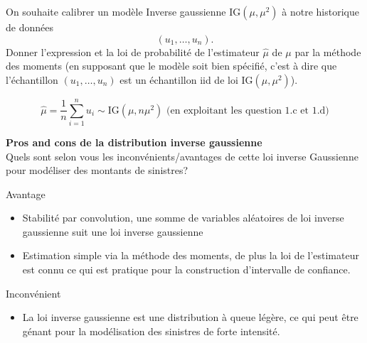 \documentclass[11pt,addpoints, answers]{exam}
\begin{document}
\begin{questions}
On souhaite calibrer un modèle Inverse gaussienne $\text{IG}(\mu,\mu^2)$ à notre historique de données
$$(u_1,\ldots, u_n).$$ 
 Donner l'expression et la loi de probabilité de l'estimateur $\widehat{\mu}$ de $\mu$ par la méthode des moments (en supposant que le modèle soit bien spécifié, c'est à dire que l'échantillon $(u_1,\ldots, u_n)$ est un échantillon iid de loi $\text{IG}(\mu,\mu^2)$).
\begin{solution}
$$
\widehat{\mu} = \frac{1}{n}\sum_{i = 1}^{n}u_i\sim \text{IG}(\mu,n\mu^2)\text{ (en exploitant les question 1.c et 1.d)}
$$
\end{solution}
\question[2] \textbf{Pros and cons de la distribution inverse gaussienne}\\
Quels sont selon vous les inconvénients/avantages de cette loi inverse Gaussienne pour modéliser des montants de sinistres?
\begin{solution}
Avantage
\begin{itemize}
	\item Stabilité par convolution, une somme de variables aléatoires de loi inverse gaussienne suit une loi inverse gaussienne
	\item Estimation simple via la méthode des moments, de plus la loi de l'estimateur est connu ce qui est pratique pour la construction d'intervalle de confiance.  
\end{itemize}
Inconvénient
\begin{itemize}
	\item La loi inverse gaussienne est une distribution à queue légère, ce qui peut être génant pour la modélisation des sinistres de forte intensité.
\end{itemize}
\end{solution}


\end{questions}
\end{document}
